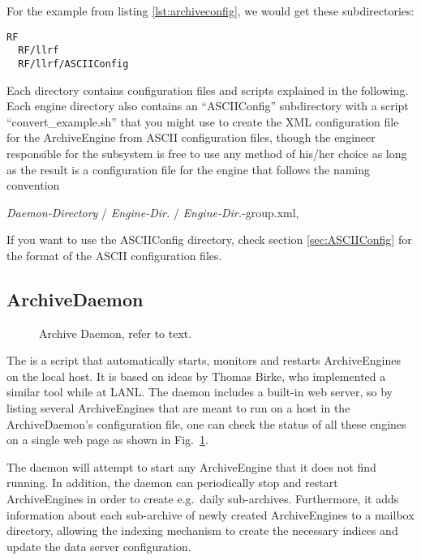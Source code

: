 For the example from listing \ref{lst:archiveconfig}, we would get
these subdirectories:
	\begin{lstlisting}[frame=none,keywordstyle=\sffamily]
  RF
  RF/llrf
  RF/llrf/ASCIIConfig
\end{lstlisting}
\noindent Each directory contains configuration files and scripts
explained in the following. Each engine directory also contains an
``ASCIIConfig'' subdirectory with a script ``convert\_example.sh''
that you might use to create the XML configuration file for the
ArchiveEngine from ASCII configuration files, though the engineer
responsible for the subsystem is free to use any method of his/her
choice as long as the result is a configuration file for the engine
that follows the naming convention
\begin{center}
\emph{Daemon-Directory} / \emph{Engine-Dir.} / \emph{Engine-Dir.}-group.xml,\\
\end{center}
If you want to use the ASCIIConfig directory, check section
\ref{sec:ASCIIConfig} for the format of the ASCII configuration files.

\subsection{ArchiveDaemon} \label{sec:daemon}
\begin{figure}[htb]
\begin{center}
\end{center}
\caption{\label{fig:daemon}Archive Daemon, refer to text.}
\end{figure}

\noindent The  is a script that automatically starts,
monitors and restarts ArchiveEngines on the local host. It is based on
ideas by Thomas Birke, who implemented a similar 
tool while at LANL. The daemon includes a built-in web server, so by
listing several ArchiveEngines that are meant to run on a host in the
ArchiveDaemon's configuration file, one can check the status of all
these engines on a single web page as shown in Fig.~\ref{fig:daemon}.

The daemon will attempt to start any ArchiveEngine
that it does not find running. In addition, the daemon can
periodically stop and restart ArchiveEngines in order to create
e.g.\ daily sub-archives.  Furthermore, it adds information about
each sub-archive of newly created ArchiveEngines to a mailbox directory,
allowing the indexing mechanism to create the necessary indices
and update the data server configuration.

